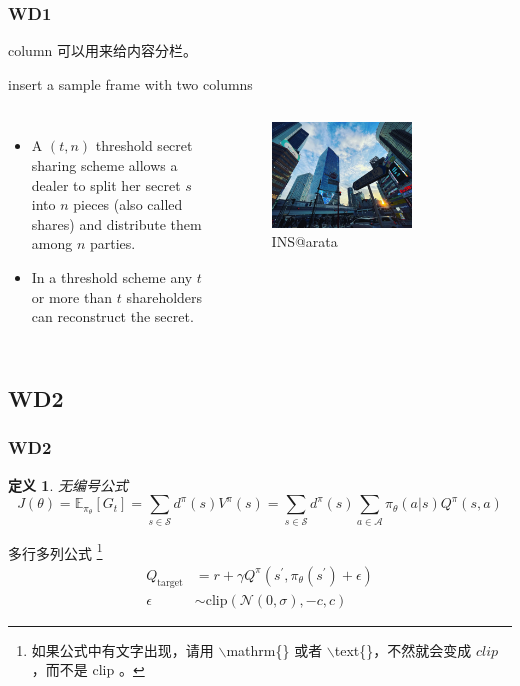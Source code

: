 \documentclass[11pt, fontset=windows, ignorenonframetext]{beamer}  %
\newtheorem{Cdefinition}[theorem]{定义}
\numberwithin{subsection}{section}
\numberwithin{theorem}{subsection}
\begin{document}
\begin{frame}
	\setlength{\parskip}{1em} %
	\frametitle{WD1}
	column 可以用来给内容分栏。
	
	insert a sample frame with two columns
	
	\begin{columns}
		\begin{itemize}
			\setlength{\itemsep}{5pt}  %
			\item A $(t,n)$ threshold secret sharing scheme allows a dealer to split her secret $s$ into $n$ pieces (also called shares) and distribute them among $n$ parties. 
			\item In a threshold scheme any $t$ or more than $t$ shareholders can reconstruct the secret. 
		\end{itemize}
		\bigskip
		\begin{figure}[ht]
			\centering
			\includegraphics[width=0.7\textwidth, height=0.4\textheight]{./Figure/arata_1.jpg}
			\caption{INS@arata}
			\label{F1}
		\end{figure}
	\end{columns}
\end{frame}

\subsection{WD2}
\begin{frame}
	\frametitle{WD2}
	\begin{Cdefinition}\label{def2}
		无编号公式 %
		\begin{equation*}
			J(\theta) = \mathbb{E}_{\pi_\theta}[G_t] = \sum_{s\in\mathcal{S}} d^\pi (s)V^\pi(s)=\sum_{s\in\mathcal{S}} d^\pi(s)\sum_{a\in\mathcal{A}}\pi_\theta(a|s)Q^\pi(s,a)
		\end{equation*}
	\end{Cdefinition}

	多行多列公式
	\footnote{如果公式中有文字出现，请用 $\backslash$mathrm\{\} 或者 $\backslash$text\{\}，不然就会变成 $clip$，而不是 $\mathrm{clip}$ 。}
    \begin{align}
        Q_\mathrm{target}&=r+\gamma Q^\pi(s^\prime, \pi_\theta(s^\prime)+\epsilon)\\
        \epsilon&\sim\mathrm{clip}(\mathcal{N}(0, \sigma), -c, c)\nonumber
    \end{align}
\end{frame}
\end{document}
